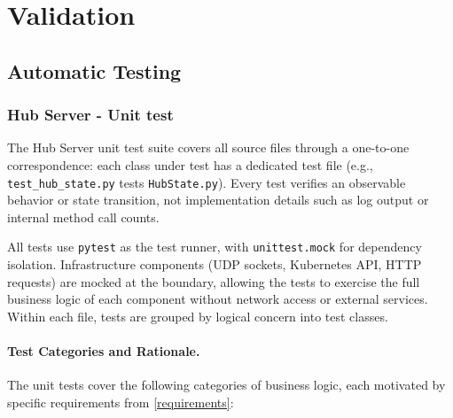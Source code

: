 \section{Validation}\label{validation}

\subsection{Automatic Testing}\label{automatic-testing}

\subsubsection{Hub Server - Unit test}
The Hub Server unit test suite covers all source files through a one-to-one correspondence: each class under test has a dedicated test file (e.g., \texttt{test\_hub\_state.py} tests \texttt{HubState.py}).
Every test verifies an observable behavior or state transition, not implementation details such as log output or internal method call counts.

All tests use \texttt{pytest} as the test runner, with \texttt{unittest.mock} for dependency isolation.
Infrastructure components (UDP sockets, Kubernetes API, HTTP requests) are mocked at the boundary, allowing the tests to exercise the full business logic of each component without network access or external services.
Within each file, tests are grouped by logical concern into test classes.

\paragraph{Test Categories and Rationale.}

The unit tests cover the following categories of business logic, each motivated by specific requirements from \cref{requirements}:

